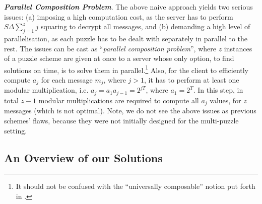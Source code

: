 \noindent\textit{\textbf{Parallel Composition Problem}}. The above naive approach yields two serious issues: (a) imposing a high computation cost, as  the server has to perform $S\Delta \sum\limits_{\scriptscriptstyle j=1}^{\scriptscriptstyle z}j$ squaring to decrypt all   messages, and (b) demanding a high level of parallelisation, as each puzzle has to be dealt with separately in parallel to the rest.  The  issues can be cast  as  ``\emph{parallel composition problem}'', where $z$ instances of a puzzle scheme are given at once to a server whose only option, to find solutions on time, is to solve them in parallel.\footnote{It should not be confused with the ``universally composable'' notion put forth in \cite{Canetti01}.} Also, for the client  to efficiently compute $a_{\scriptscriptstyle j}$  for each  message $m_{\scriptscriptstyle j}$,  where $j>1$, it has to perform at least one modular multiplication, i.e. $a_{\scriptscriptstyle j}=a_{\scriptscriptstyle 1} a_{\scriptscriptstyle j-1}=2^{\scriptscriptstyle j  T}$, where $a_{\scriptscriptstyle 1}=2^{\scriptscriptstyle T}$. In this step, in total $z-1$ modular multiplications are required  to compute all $a_{\scriptscriptstyle j}$ values, for $z$ messages (which is not optimal). Note, we do not see the above issues as  previous schemes' flaws, because they were not initially designed for the multi-puzzle setting.  
 
\vspace{-3mm}



 \subsection{An Overview of our Solutions}\label{Overview-of-our-Solutions}
 
 \vspace{-2mm}
 
